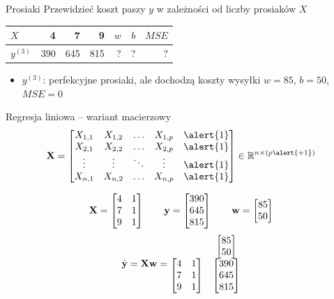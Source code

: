 \documentclass{sa}
\renewcommand{\vec}[1]{\ensuremath\mathbf{#1}}
\begin{document}
\begin{frame}{Prosiaki}
Przewidzieć \alert{koszt paszy $y$} w zależności od \alert{liczby prosiaków $X$}

\begin{center}
\begin{tabular}{l|rrr|rrr}
$X$ & 4 & 7 & 9 & $w$ & $b$ & $MSE$ \\
\hline
$y^{(3)}$ & 390 & 645 & 815 & \alert{?} & \alert{?} & \alert{?} \\
\end{tabular}
\end{center}

{
\begin{itemize}
\item $y^{(3)}$: perfekcyjne prosiaki, ale dochodzą koszty wysyłki $w=85$, $b=50$, $MSE=0$
\end{itemize}
}
\end{frame}

\begin{frame}{Regresja liniowa -- wariant macierzowy}
\[ \vec{X} = \begin{bmatrix}
X_{1,1} & X_{1,2} & \ldots & X_{1,p} & \alert{1} \\
X_{2,1} & X_{2,2} & \ldots & X_{2,p} & \alert{1}\\
\vdots & \vdots & \ddots & \vdots & \alert{1}\\
X_{n,1} & X_{n,2} & \ldots & X_{n,p} & \alert{1}\\
\end{bmatrix} \in \R^{n\times (p\alert{+1})} \]

\pause
\[
\vec{X} = \begin{bmatrix}
4 & 1\\
7 & 1\\
9 & 1\\
\end{bmatrix}
\qquad
\vec{y}=\begin{bmatrix}
390 \\
645 \\
815 \\
\end{bmatrix}
\qquad
\vec{w}=\begin{bmatrix}
85 \\ 50
\end{bmatrix}
\]
\[
\hat{\vec{y}} = \vec{X}\vec{w}=\begin{matrix}
& \begin{bmatrix}
85 \\ 50
\end{bmatrix} \\
\begin{bmatrix}
4 & 1\\
7 & 1\\
9 & 1\\
\end{bmatrix}
&
\begin{bmatrix}
390 \\ 645 \\ 815
\end{bmatrix}
\end{matrix}
\]
\end{frame}
\end{document}
